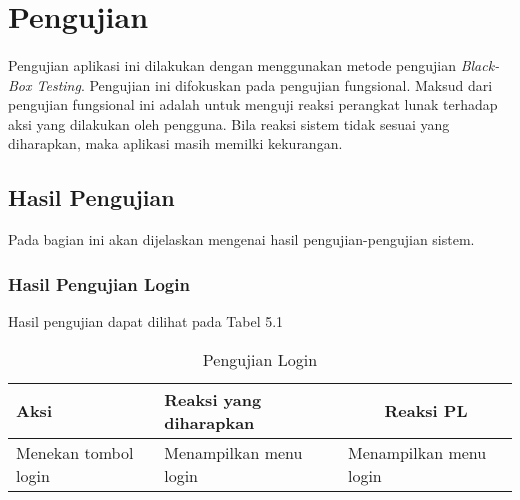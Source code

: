 \section{Pengujian}
\paragraph{} Pengujian aplikasi ini dilakukan dengan menggunakan metode pengujian \textit{Black-Box Testing}. Pengujian ini difokuskan pada pengujian fungsional. Maksud dari pengujian fungsional ini adalah untuk menguji reaksi perangkat lunak terhadap aksi yang dilakukan oleh pengguna. Bila reaksi sistem tidak sesuai yang diharapkan, maka aplikasi masih memilki kekurangan.

\subsection{Hasil Pengujian}
Pada bagian ini akan dijelaskan mengenai hasil pengujian-pengujian sistem.
\subsubsection{Hasil Pengujian Login}
Hasil pengujian dapat dilihat pada Tabel 5.1
\begin{center}
	\begin{table}[H]
		\caption{Pengujian Login}
		\begin{tabular}{|p{5cm}|p{5cm}|p{5cm}|}
		\hline
		\centering Aksi	& 	\centering Reaksi yang diharapkan &  \multicolumn{1}{c|}{Reaksi PL} \\
		\hline
		Menekan tombol login & Menampilkan menu login & Menampilkan menu login \\
		\hline
		\end{tabular}
	\end{table}
\end{center}

